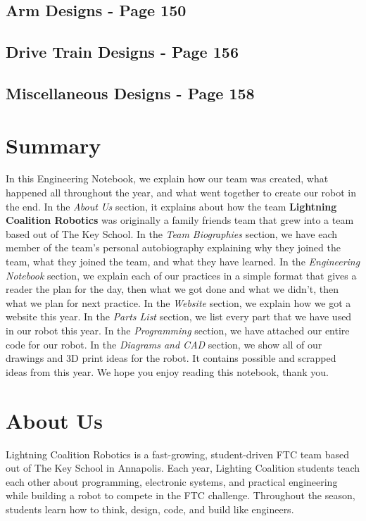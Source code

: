 \documentclass[12pt]{article}
\begin{document}
\subsection{Arm Designs - Page 150}

\subsection{Drive Train Designs - Page 156}

\subsection{Miscellaneous Designs - Page 158}

\subsection*{}

\newpage
\setlength{\headheight}{25pt}
\setcounter{section}{0}

\section*{Summary}
In this Engineering Notebook, we explain how our team was created, what happened all throughout the year, and what went together to create our robot in the end. In the \textit{About Us} section, it explains about how the team \textbf{Lightning Coalition Robotics} was originally a family friends team that grew into a team based out of The Key School. In the \textit{Team Biographies} section, we have each member of the team's personal autobiography explaining why they joined the team, what they joined the team, and what they have learned. In the \textit{Engineering Notebook} section, we explain each of our practices in a simple format that gives a reader the plan for the day, then what we got done and what we didn't, then what we plan for next practice. In the \textit{Website} section, we explain how we got a website this year. In the \textit{Parts List} section, we list every part that we have used in our robot this year. In the \textit{Programming} section, we have attached our entire code for our robot. In the \textit{Diagrams and CAD} section, we show all of our drawings and 3D print ideas for the robot. It contains possible and scrapped ideas from this year. We hope you enjoy reading this notebook, thank you.

\newpage
\setcounter{section}{0}

\section*{About Us}
Lightning Coalition Robotics is a fast-growing, student-driven FTC team based out of The Key School in Annapolis. Each year, Lighting Coalition students teach each other about programming, electronic systems, and practical engineering while building a robot to compete in the FTC challenge. Throughout the season, students learn how to think, design, code, and build like engineers.
\end{document}
